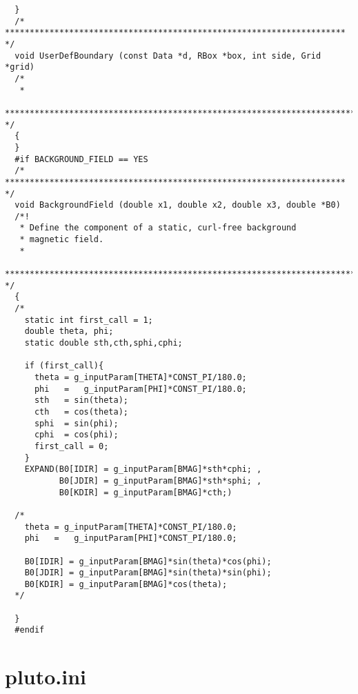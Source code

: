 \begin{lstlisting}
  }
  /* ********************************************************************* */
  void UserDefBoundary (const Data *d, RBox *box, int side, Grid *grid)
  /*
   *
   *********************************************************************** */
  {
  }
  #if BACKGROUND_FIELD == YES
  /* ********************************************************************* */
  void BackgroundField (double x1, double x2, double x3, double *B0)
  /*!
   * Define the component of a static, curl-free background
   * magnetic field.
   *
   *********************************************************************** */
  {
  /*
    static int first_call = 1;
    double theta, phi;
    static double sth,cth,sphi,cphi;

    if (first_call){
      theta = g_inputParam[THETA]*CONST_PI/180.0;
      phi   =   g_inputParam[PHI]*CONST_PI/180.0;
      sth   = sin(theta);
      cth   = cos(theta);
      sphi  = sin(phi);
      cphi  = cos(phi);
      first_call = 0;
    }
    EXPAND(B0[IDIR] = g_inputParam[BMAG]*sth*cphi; ,
           B0[JDIR] = g_inputParam[BMAG]*sth*sphi; ,
           B0[KDIR] = g_inputParam[BMAG]*cth;)

  /*
    theta = g_inputParam[THETA]*CONST_PI/180.0;
    phi   =   g_inputParam[PHI]*CONST_PI/180.0;

    B0[IDIR] = g_inputParam[BMAG]*sin(theta)*cos(phi);
    B0[JDIR] = g_inputParam[BMAG]*sin(theta)*sin(phi);
    B0[KDIR] = g_inputParam[BMAG]*cos(theta);
  */

  }
  #endif

\end{lstlisting}

\section{pluto.ini}
\label{plu}

